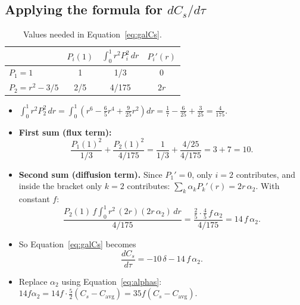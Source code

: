 \documentclass[11pt,a4paper]{article}
\newcommand{\avg}{\mathrm{avg}}
\begin{document}
\subsection{Applying the formula for $dC_s/d\tau$}
\begin{table}[H]\centering
\begin{tabular}{lccc}\toprule
 & $P_i(1)$ & $\int_0^1r^2P_i^2\,dr$ & $P_i'(r)$\\\midrule
$P_1=1$ & 1 & 1/3 & 0\\
$P_2=r^2-3/5$ & 2/5 & 4/175 & $2r$\\\bottomrule
\end{tabular}
\caption{Values needed in Equation~\eqref{eq:galCs}.}
\end{table}
\begin{itemize}
  \item $\int_0^1r^2P_2^2\,dr=\int_0^1\left(r^6-\frac65r^4+\frac9{25}r^2\right)dr=\frac17-\frac6{25}+\frac3{25}=\frac4{175}$.
  \item \textbf{First sum (flux term):}
  \[
    \frac{P_1(1)^2}{1/3}+\frac{P_2(1)^2}{4/175} = \frac1{1/3}+\frac{4/25}{4/175}=3+7=10.
  \]
  \item \textbf{Second sum (diffusion term).} Since $P_1'=0$, only $i=2$ contributes, and inside the bracket only $k=2$ contributes: $\sum_k\alpha_kP_k'(r)=2r\,\alpha_2$. With constant $f$:
  \[
    \frac{P_2(1)\,f\int_0^1r^2\,(2r)(2r\,\alpha_2)\,dr}{4/175} = \frac{\frac25\cdot\frac45\,f\,\alpha_2}{4/175} = 14\,f\,\alpha_2.
  \]
  \item So Equation~\eqref{eq:galCs} becomes
  \[
    \frac{dC_s}{d\tau} = -10\,\delta-14\,f\,\alpha_2.
  \]
  \item Replace $\alpha_2$ using Equation~\eqref{eq:alphas}: $14f\alpha_2=14f\cdot\frac52(C_s-C_\avg)=35f(C_s-C_\avg)$.
\end{itemize}
\end{document}

